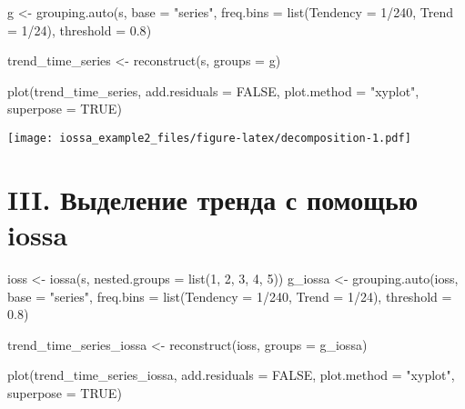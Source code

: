 \documentclass[
]{article}
\newenvironment{Shaded}{\begin{snugshade}}{\end{snugshade}}
\newcommand{\AttributeTok}[1]{\textcolor[rgb]{0.77,0.63,0.00}{#1}}
\newcommand{\ConstantTok}[1]{\textcolor[rgb]{0.00,0.00,0.00}{#1}}
\newcommand{\DecValTok}[1]{\textcolor[rgb]{0.00,0.00,0.81}{#1}}
\newcommand{\FloatTok}[1]{\textcolor[rgb]{0.00,0.00,0.81}{#1}}
\newcommand{\FunctionTok}[1]{\textcolor[rgb]{0.00,0.00,0.00}{#1}}
\newcommand{\NormalTok}[1]{#1}
\newcommand{\OtherTok}[1]{\textcolor[rgb]{0.56,0.35,0.01}{#1}}
\newcommand{\SpecialCharTok}[1]{\textcolor[rgb]{0.00,0.00,0.00}{#1}}
\newcommand{\StringTok}[1]{\textcolor[rgb]{0.31,0.60,0.02}{#1}}
\begin{document}
\begin{Shaded}
\begin{Highlighting}[]
\NormalTok{  g }\OtherTok{\textless{}{-}} \FunctionTok{grouping.auto}\NormalTok{(s, }\AttributeTok{base =} \StringTok{"series"}\NormalTok{, }
                 \AttributeTok{freq.bins =} \FunctionTok{list}\NormalTok{(}\AttributeTok{Tendency =} \DecValTok{1}\SpecialCharTok{/}\DecValTok{240}\NormalTok{, }\AttributeTok{Trend =} \DecValTok{1}\SpecialCharTok{/}\DecValTok{24}\NormalTok{), }
                 \AttributeTok{threshold =} \FloatTok{0.8}\NormalTok{)}
                 
\NormalTok{  trend\_time\_series }\OtherTok{\textless{}{-}} \FunctionTok{reconstruct}\NormalTok{(s, }\AttributeTok{groups =}\NormalTok{ g)}
  
  \FunctionTok{plot}\NormalTok{(trend\_time\_series, }
   \AttributeTok{add.residuals =} \ConstantTok{FALSE}\NormalTok{, }
   \AttributeTok{plot.method =} \StringTok{"xyplot"}\NormalTok{, }\AttributeTok{superpose =} \ConstantTok{TRUE}\NormalTok{)}
\end{Highlighting}
\end{Shaded}

\texttt{[image: iossa\_example2\_files/figure-latex/decomposition-1.pdf]}

\hypertarget{iii.-ux432ux44bux434ux435ux43bux435ux43dux438ux435-ux442ux440ux435ux43dux434ux430-ux441-ux43fux43eux43cux43eux449ux44cux44e-iossa}{%
\section{III. Выделение тренда с помощью
iossa}\label{iii.-ux432ux44bux434ux435ux43bux435ux43dux438ux435-ux442ux440ux435ux43dux434ux430-ux441-ux43fux43eux43cux43eux449ux44cux44e-iossa}}

\begin{Shaded}
\begin{Highlighting}[]
\NormalTok{  ioss }\OtherTok{\textless{}{-}} \FunctionTok{iossa}\NormalTok{(s, }\AttributeTok{nested.groups =} \FunctionTok{list}\NormalTok{(}\DecValTok{1}\NormalTok{, }\DecValTok{2}\NormalTok{, }\DecValTok{3}\NormalTok{, }\DecValTok{4}\NormalTok{, }\DecValTok{5}\NormalTok{))}
\NormalTok{  g\_iossa }\OtherTok{\textless{}{-}} \FunctionTok{grouping.auto}\NormalTok{(ioss, }\AttributeTok{base =} \StringTok{"series"}\NormalTok{, }
                 \AttributeTok{freq.bins =} \FunctionTok{list}\NormalTok{(}\AttributeTok{Tendency =} \DecValTok{1}\SpecialCharTok{/}\DecValTok{240}\NormalTok{, }\AttributeTok{Trend =} \DecValTok{1}\SpecialCharTok{/}\DecValTok{24}\NormalTok{), }
                 \AttributeTok{threshold =} \FloatTok{0.8}\NormalTok{)}
                 
\NormalTok{  trend\_time\_series\_iossa }\OtherTok{\textless{}{-}} \FunctionTok{reconstruct}\NormalTok{(ioss, }\AttributeTok{groups =}\NormalTok{ g\_iossa)}
  
  \FunctionTok{plot}\NormalTok{(trend\_time\_series\_iossa, }
   \AttributeTok{add.residuals =} \ConstantTok{FALSE}\NormalTok{, }
   \AttributeTok{plot.method =} \StringTok{"xyplot"}\NormalTok{, }\AttributeTok{superpose =} \ConstantTok{TRUE}\NormalTok{)}
\end{Highlighting}
\end{Shaded}
\end{document}
